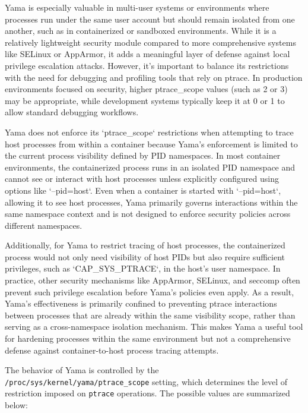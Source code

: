 \documentclass[12pt]{report}
\begin{document}
\begin{doublespace}
Yama is especially valuable in multi-user systems or environments where processes run under the same user account but should remain isolated from one another, such as in containerized or sandboxed environments. While it is a relatively lightweight security module compared to more comprehensive systems like SELinux or AppArmor, it adds a meaningful layer of defense against local privilege escalation attacks. However, it’s important to balance its restrictions with the need for debugging and profiling tools that rely on ptrace. In production environments focused on security, higher ptrace\_scope values (such as 2 or 3) may be appropriate, while development systems typically keep it at 0 or 1 to allow standard debugging workflows.

Yama does not enforce its `ptrace\_scope` restrictions when attempting to trace host processes from within a container because Yama’s enforcement is limited to the current process visibility defined by PID namespaces. In most container environments, the containerized process runs in an isolated PID namespace and cannot see or interact with host processes unless explicitly configured using options like `--pid=host`. Even when a container is started with `--pid=host`, allowing it to see host processes, Yama primarily governs interactions within the same namespace context and is not designed to enforce security policies across different namespaces.

Additionally, for Yama to restrict tracing of host processes, the containerized process would not only need visibility of host PIDs but also require sufficient privileges, such as `CAP\_SYS\_PTRACE`, in the host’s user namespace. In practice, other security mechanisms like AppArmor, SELinux, and seccomp often prevent such privilege escalation before Yama’s policies even apply. As a result, Yama’s effectiveness is primarily confined to preventing ptrace interactions between processes that are already within the same visibility scope, rather than serving as a cross-namespace isolation mechanism. This makes Yama a useful tool for hardening processes within the same environment but not a comprehensive defense against container-to-host process tracing attempts.


The behavior of Yama is controlled by the \texttt{/proc/sys/kernel/yama/ptrace\_scope} setting, which determines the level of restriction imposed on \texttt{ptrace} operations. The possible values are summarized below:


\end{doublespace}
\end{document}
